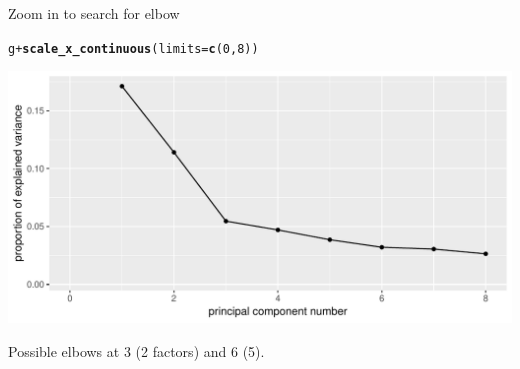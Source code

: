 \documentclass[unknownkeysallowed]{beamer}\usepackage[]{graphicx}\usepackage[]{color}
\makeatletter
\def\maxwidth{ %
  \ifdim\Gin@nat@width>\linewidth
    \linewidth
  \else
    \Gin@nat@width
  \fi
}
\newcommand{\hlnum}[1]{\textcolor[rgb]{0.686,0.059,0.569}{#1}}%
\newcommand{\hlopt}[1]{\textcolor[rgb]{0,0,0}{#1}}%
\newcommand{\hlstd}[1]{\textcolor[rgb]{0.345,0.345,0.345}{#1}}%
\newcommand{\hlkwc}[1]{\textcolor[rgb]{0.333,0.667,0.333}{#1}}%
\newcommand{\hlkwd}[1]{\textcolor[rgb]{0.737,0.353,0.396}{\textbf{#1}}}%
\newenvironment{kframe}{%
 \def\at@end@of@kframe{}%
 \ifinner\ifhmode%
  \def\at@end@of@kframe{\end{minipage}}%
  \begin{minipage}{\columnwidth}%
 \fi\fi%
 \def\FrameCommand##1{\hskip\@totalleftmargin \hskip-\fboxsep
 \colorbox{shadecolor}{##1}\hskip-\fboxsep
     \hskip-\linewidth \hskip-\@totalleftmargin \hskip\columnwidth}%
 \MakeFramed {\advance\hsize-\width
   \@totalleftmargin\z@ \linewidth\hsize
   \@setminipage}}%
 {\par\unskip\endMakeFramed%
 \at@end@of@kframe}
\newenvironment{knitrout}{}{} %
\makeatother
\begin{document}
\begin{frame}[fragile]{Zoom in to search for elbow}
  
\begin{knitrout}
\color{fgcolor}\begin{kframe}
\begin{alltt}
\hlstd{g}\hlopt{+}\hlkwd{scale_x_continuous}\hlstd{(}\hlkwc{limits}\hlstd{=}\hlkwd{c}\hlstd{(}\hlnum{0}\hlstd{,}\hlnum{8}\hlstd{))}
\end{alltt}
\end{kframe}
\includegraphics[width=\maxwidth]{figure/bem-scree-two-1} 

\end{knitrout}

Possible elbows at 3 (2 factors) and 6 (5).
  
\end{frame}
\end{document}
